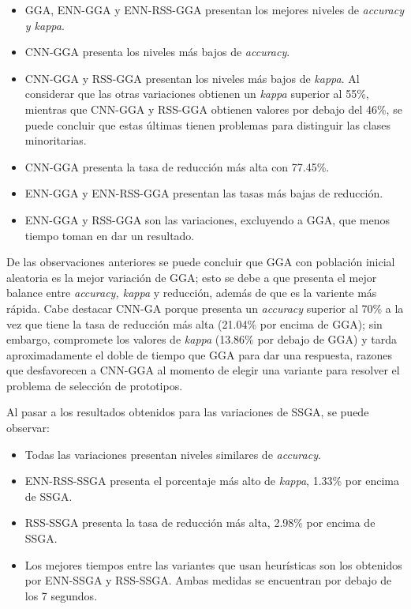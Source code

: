 \begin{itemize}

\item GGA, ENN-GGA y ENN-RSS-GGA presentan los mejores niveles de \emph{accuracy y kappa}.

\item CNN-GGA presenta los niveles más bajos de \emph{accuracy}.

\item CNN-GGA y RSS-GGA presentan los niveles más bajos de \emph{kappa}. Al considerar que las otras variaciones obtienen un \emph{kappa} superior al 55\%, mientras que CNN-GGA y RSS-GGA obtienen valores por debajo del 46\%, se puede concluir que estas últimas tienen problemas para distinguir las clases minoritarias.

\item CNN-GGA presenta la tasa de reducción más alta con 77.45\%.

\item ENN-GGA y ENN-RSS-GGA presentan las tasas más bajas de reducción.

\item ENN-GGA y RSS-GGA son las variaciones, excluyendo a GGA, que menos tiempo toman en dar un resultado.

\end{itemize}

De las observaciones anteriores se puede concluir que GGA con población inicial aleatoria es la mejor variación de GGA; esto se debe a que presenta el mejor balance entre \emph{accuracy, kappa} y reducción, además de que es la variente más rápida. Cabe destacar CNN-GA porque presenta un \emph{accuracy} superior al 70\% a la vez que tiene la tasa de reducción más alta (21.04\% por encima de GGA); sin embargo, compromete los valores de \emph{kappa} (13.86\% por debajo de GGA) y tarda aproximadamente el doble de tiempo que GGA para dar una respuesta, razones que desfavorecen a CNN-GGA al momento de elegir una variante para resolver el problema de selección de prototipos.

Al pasar a los resultados obtenidos para las variaciones de SSGA, se puede observar:

\begin{itemize}

\item Todas las variaciones presentan niveles similares de \emph{accuracy}.

\item ENN-RSS-SSGA presenta el porcentaje más alto de \emph{kappa}, 1.33\% por encima de SSGA.

\item RSS-SSGA presenta la tasa de reducción más alta, 2.98\% por encima de SSGA.

\item Los mejores tiempos entre las variantes que usan heurísticas son los obtenidos por ENN-SSGA y RSS-SSGA. Ambas medidas se encuentran por debajo de los 7 segundos. 

\end{itemize}

